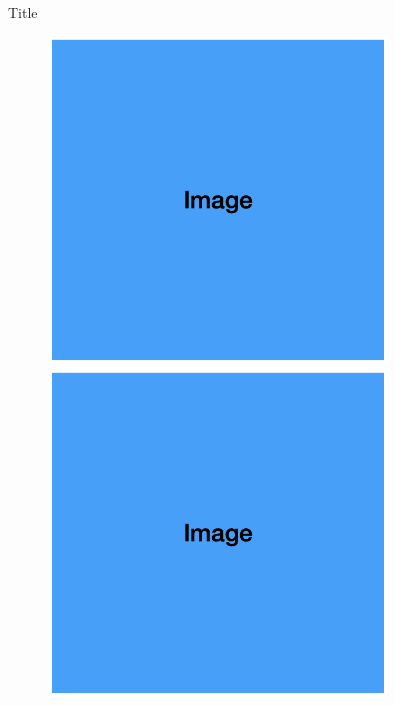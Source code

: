 \documentclass[8pt, aspectratio=169]{beamer} %
\begin{document}
\begin{frame}{Title}
    \begin{figure}[!tbp]
      \centering
      \begin{minipage}[b]{0.4\textwidth}
        \centering
        \includegraphics[width=0.8\textwidth]{assets/placeholder_img.png}
      \end{minipage}
      \hspace{20pt}
      \begin{minipage}[b]{0.4\textwidth}
        \centering
        \includegraphics[width=0.8\textwidth]{assets/placeholder_img.png}
      \end{minipage}
    \end{figure}
\end{frame}
\end{document}
